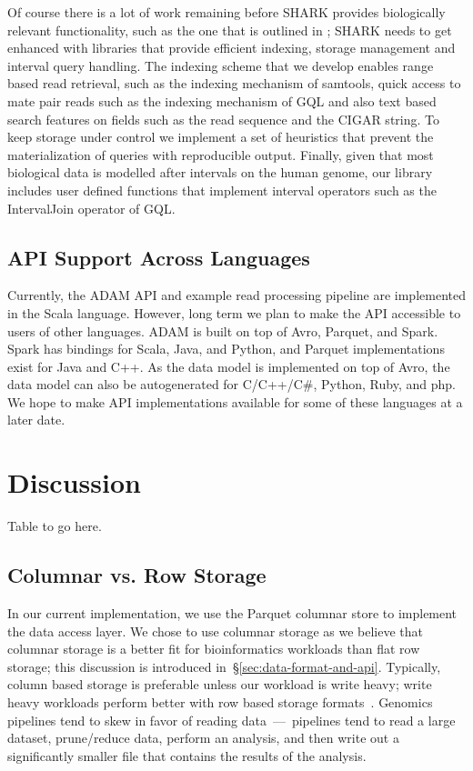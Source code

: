 \documentclass[10pt,twocolumn]{article}
\begin{document}
Of course there is a lot of work remaining before SHARK provides biologically relevant functionality,
such as the one that is outlined in \cite{bafna2013}; SHARK needs to get enhanced with libraries that provide
efficient indexing, storage management
and interval query handling. The indexing scheme that we develop enables range based read retrieval, such as the
indexing mechanism of samtools, quick access to mate pair reads such as the indexing mechanism of GQL \cite{kozanitis13} and
also text based search features on fields such as the read sequence and the CIGAR string. To keep storage
under control we implement a set of heuristics that prevent the materialization of queries with reproducible output. 
Finally, given that most biological data is modelled after intervals on the human genome, our library includes
user defined functions that implement interval operators such as the IntervalJoin operator of GQL.

\subsection{API Support Across Languages}
\label{sec:api-support-across-languages}

Currently, the ADAM API and example read processing pipeline are implemented in the Scala language. However, long
term we plan to make the API accessible to users of other languages. ADAM is built on top of Avro, Parquet, and Spark.
Spark has bindings for Scala, Java, and Python, and Parquet implementations exist for Java and C++. As the data model
is implemented on top of Avro, the data model can also be auto\-generated for C/C++/C\#, Python, Ruby, and php. We hope
to make API implementations available for some of these languages at a later date.

\section{Discussion}
\label{sec:discussion}

Table to go here.

\subsection{Columnar vs. Row Storage}
\label{sec:columnar-vs-row-storage}

In our current implementation, we use the Parquet columnar store to implement the data access layer. We chose to use
columnar storage as we believe that columnar storage is a better fit for bioinformatics workloads than flat row storage;
this discussion is introduced in~\S\ref{sec:data-format-and-api}. Typically, column based storage is preferable unless
our workload is write heavy; write heavy workloads perform better with row based storage formats~\cite{stonebraker05}.
Genomics pipelines tend to skew in favor of reading data~---~pipelines tend to read a large dataset, prune/reduce data,
perform an analysis, and then write out a significantly smaller file that contains the results of the analysis.
\end{document}
